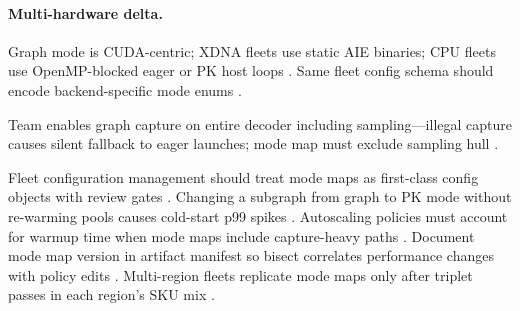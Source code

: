 \paragraph{Multi-hardware delta.} Graph mode is CUDA-centric; XDNA fleets use static AIE binaries; CPU fleets use OpenMP-blocked eager or PK host loops \citep{amd2024xdna,amd2024aie,nvidia2024cudagraphs,yirage2026,chen2020compilerbasedhardw,patel2025llminference,dlbook,semianalysis2024tma,taxbreak2026,memoryfloor2026,kwon2023vllm,liu2024deepseekv3,dao2022flashattention,dao2023flashdecoding,nvidia2022hopper,dlbook}. Same fleet config schema should encode backend-specific mode enums \citep{yirage2026,chen2020compilerbasedhardw,patel2025llminference,amd2024aie,amd2024xdna,dlbook}.

\begin{example}
Team enables graph capture on entire decoder including sampling---illegal capture causes silent fallback to eager launches; mode map must exclude sampling hull \citep{nvidia2024cudagraphs,kwon2023vllm,patel2025llminference,yirage2026,chen2020compilerbasedhardw,taxbreak2026,memoryfloor2026,dlbook}.
\end{example}

Fleet configuration management should treat mode maps as first-class config objects with review gates \citep{patel2025llminference,yirage2026,chen2020compilerbasedhardw,kwon2023vllm,nvidia2024cudagraphs,dlbook}. Changing a subgraph from graph to PK mode without re-warming pools causes cold-start p99 spikes \citep{memoryfloor2026,yirage2026,chen2020compilerbasedhardw,patel2025llminference,kwon2023vllm,dlbook}. Autoscaling policies must account for warmup time when mode maps include capture-heavy paths \citep{memoryfloor2026,nvidia2024cudagraphs,patel2025llminference,yirage2026,chen2020compilerbasedhardw,dlbook}. Document mode map version in artifact manifest so bisect correlates performance changes with policy edits \citep{yirage2026,chen2020compilerbasedhardw,patel2025llminference,dlbook}. Multi-region fleets replicate mode maps only after triplet passes in each region's SKU mix \citep{patel2025llminference,yirage2026,chen2020compilerbasedhardw,amd2024xdna,amd2024aie,semianalysis2024tma,dlbook,taxbreak2026,memoryfloor2026,kwon2023vllm,liu2024deepseekv3,nvidia2024cudagraphs,dao2022flashattention,dao2023flashdecoding,nvidia2022hopper,dlbook}.


